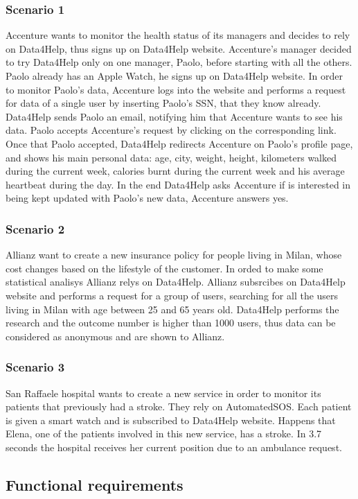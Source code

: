 \documentclass{article}
\begin{document}
\subsubsection{Scenario 1}
Accenture wants to monitor the health status of its managers and decides to rely on Data4Help, thus signs up on Data4Help website.
Accenture's manager decided to try Data4Help only on one manager, Paolo, before starting with all the others. Paolo already has an Apple Watch, he signs up on Data4Help website.
In order to monitor Paolo's data, Accenture logs into the website and performs a request for data of a single user by inserting Paolo's SSN, that they know already.
Data4Help sends Paolo an email, notifying him that Accenture wants to see his data.
Paolo accepts Accenture's request by clicking on the corresponding link.
Once that Paolo accepted, Data4Help redirects Accenture on Paolo's profile page, and shows his main personal data: age, city, weight, height, kilometers walked during the current week, calories burnt during the current week and his average heartbeat during the day.
In the end Data4Help asks Accenture if is interested in being kept updated with Paolo's new data, Accenture answers yes.
\subsubsection{Scenario 2}
Allianz want to create a new insurance policy for people living in Milan, whose cost changes based on the lifestyle of the customer. In orded to make some statistical analisys Allianz relys on Data4Help.
Allianz subsrcibes on Data4Help website and performs a request for a group of users, searching for all the users living in Milan with age between 25 and 65 years old.
Data4Help performs the research and the outcome number is higher than 1000 users, thus data can be considered as anonymous and are shown to Allianz.
\subsubsection{Scenario 3}
San Raffaele hospital wants to create a new service in order to monitor its patients that previously had a stroke. They rely on AutomatedSOS. Each patient is given a smart watch and is subscribed to Data4Help website. Happens that Elena, one of the patients involved in this new service, has a stroke. In 3.7 seconds the hospital receives her current position due to an ambulance request.
\subsection{Functional requirements}
\end{document}
